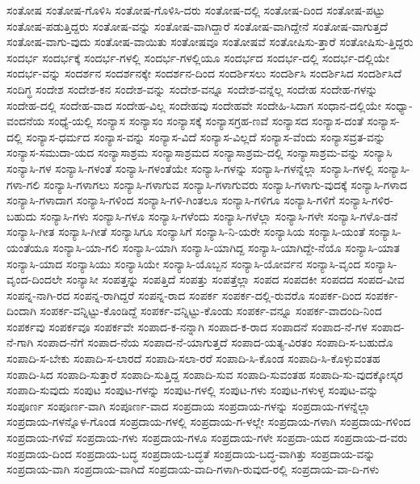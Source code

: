 {ಸಂತೋಷ
ಸಂತೋಷ-ಗೊಳಿಸಿ
ಸಂತೋಷ-ಗೊಳಿಸಿ-ದರು
ಸಂತೋಷ-ದಲ್ಲಿ
ಸಂತೋಷ-ದಿಂದ
ಸಂತೋಷ-ಪಟ್ಟು
ಸಂತೋಷ-ಪಡುತ್ತಿದ್ದರು
ಸಂತೋಷ-ವನ್ನು
ಸಂತೋಷ-ವಾಗಿದ್ದಾರೆ
ಸಂತೋಷ-ವಾಗಿದ್ದೇನೆ
ಸಂತೋಷ-ವಾಗುತ್ತದೆ
ಸಂತೋಷ-ವಾಗು-ವುದು
ಸಂತೋಷ-ವಾಯಿತು
ಸಂತೋಷವೂ
ಸಂತೋಷವೆ
ಸಂತೋಷಿಸು-ತ್ತಾರೆ
ಸಂತೋಷಿಸು-ತ್ತಿದ್ದರು
ಸಂದರ್ಭ
ಸಂದರ್ಭಕ್ಕೆ
ಸಂದರ್ಭ-ಗಳಲ್ಲಿ
ಸಂದರ್ಭ-ಗಳಲ್ಲಿಯೂ
ಸಂದರ್ಭದ
ಸಂದರ್ಭ-ದಲ್ಲಿ
ಸಂದರ್ಭ-ದಲ್ಲಿಯೇ
ಸಂದರ್ಭ-ವನ್ನು
ಸಂದರ್ಶನ
ಸಂದರ್ಶನಕ್ಕೇ
ಸಂದರ್ಶನ-ದಿಂದ
ಸಂದರ್ಶಿಸಲು
ಸಂದರ್ಶಿಸಿ
ಸಂದರ್ಶಿಸಿದ
ಸಂದರ್ಶಿಸಿದೆ
ಸಂದಿಗ್ಧ
ಸಂದೇಶ
ಸಂದೇಶ-ಕನ
ಸಂದೇಶ-ವನ್ನು
ಸಂದೇಶ-ವನ್ನೂ
ಸಂದೇಶ-ವನ್ನೆಲ್ಲ
ಸಂದೇಹ
ಸಂದೇಹ-ಗಳನ್ನು
ಸಂದೇಹ-ದಲ್ಲಿ
ಸಂದೇಹ-ವಾದ
ಸಂದೇಹ-ವಿಲ್ಲ
ಸಂದೇಹವು
ಸಂದೇಹವೇ
ಸಂದೇಹಿ-ಸಿದಾಗ
ಸಂಧಾನ-ದಲ್ಲಿಯೇ
ಸಂಧ್ಯಾ-ವಂದನೆಯ
ಸಂಧ್ಯೆ-ಯಲ್ಲಿ
ಸಂನ್ಯಾಸ
ಸಂನ್ಯಾಸಂ
ಸಂನ್ಯಾಸಕ್ಕೆ
ಸಂನ್ಯಾಸಗ್ರಹ-ಣವೆ
ಸಂನ್ಯಾಸದ
ಸಂನ್ಯಾಸ-ದಂತೆ
ಸಂನ್ಯಾಸ-ದಲ್ಲಿ
ಸಂನ್ಯಾಸ-ಧರ್ಮದ
ಸಂನ್ಯಾಸ-ವನ್ನು
ಸಂನ್ಯಾಸ-ವಿದೆ
ಸಂನ್ಯಾಸ-ವಿಲ್ಲದೆ
ಸಂನ್ಯಾಸ-ವೆಂದು
ಸಂನ್ಯಾಸವ್ರತ-ವನ್ನು
ಸಂನ್ಯಾಸ-ಸಮುದಾ-ಯದ
ಸಂನ್ಯಾಸಾಶ್ರಮ
ಸಂನ್ಯಾಸಾಶ್ರಮದ
ಸಂನ್ಯಾಸಾಶ್ರಮ-ದಲ್ಲಿ
ಸಂನ್ಯಾಸಾಶ್ರಮ-ವನ್ನು
ಸಂನ್ಯಾಸಿ
ಸಂನ್ಯಾಸಿ-ಗಳ
ಸಂನ್ಯಾಸಿ-ಗಳಂತೆ
ಸಂನ್ಯಾಸಿ-ಗಳಂತೆಯೇ
ಸಂನ್ಯಾಸಿ-ಗಳನ್ನು
ಸಂನ್ಯಾಸಿ-ಗಳನ್ನೆಲ್ಲಾ
ಸಂನ್ಯಾಸಿ-ಗಳಲ್ಲಿ
ಸಂನ್ಯಾಸಿ-ಗಳಾ-ಗಲಿ
ಸಂನ್ಯಾಸಿ-ಗಳಾಗಲು
ಸಂನ್ಯಾಸಿ-ಗಳಾಗುವ
ಸಂನ್ಯಾಸಿ-ಗಳಾಗುವರು
ಸಂನ್ಯಾಸಿ-ಗಳಾಗು-ವುದಕ್ಕೆ
ಸಂನ್ಯಾಸಿ-ಗಳಾದ
ಸಂನ್ಯಾಸಿ-ಗಳಾದಾಗ
ಸಂನ್ಯಾಸಿ-ಗಳಿಂದ
ಸಂನ್ಯಾಸಿ-ಗಳಿ-ಗಿಂತಲೂ
ಸಂನ್ಯಾಸಿ-ಗಳಿಗೂ
ಸಂನ್ಯಾಸಿ-ಗಳಿಗೆ
ಸಂನ್ಯಾಸಿ-ಗಳಿರ-ಬಹುದು
ಸಂನ್ಯಾಸಿ-ಗಳು
ಸಂನ್ಯಾಸಿ-ಗಳೂ
ಸಂನ್ಯಾಸಿ-ಗಳೆಂದು
ಸಂನ್ಯಾಸಿ-ಗಳೆಲ್ಲಾ
ಸಂನ್ಯಾಸಿ-ಗಳೇ
ಸಂನ್ಯಾಸಿ-ಗಳೊ-ಡನೆ
ಸಂನ್ಯಾಸಿ-ಗೀತ
ಸಂನ್ಯಾಸಿ-ಗೀತೆ
ಸಂನ್ಯಾಸಿಗೂ
ಸಂನ್ಯಾಸಿಗೆ
ಸಂನ್ಯಾಸಿ-ನಿ-ಯರೇ
ಸಂನ್ಯಾಸಿಯ
ಸಂನ್ಯಾಸಿ-ಯಂತೆ
ಸಂನ್ಯಾಸಿ-ಯಂತೆಯೂ
ಸಂನ್ಯಾಸಿ-ಯಾ-ಗಲಿ
ಸಂನ್ಯಾಸಿ-ಯಾಗಿ
ಸಂನ್ಯಾಸಿ-ಯಾಗಿದ್ದ
ಸಂನ್ಯಾಸಿ-ಯಾಗಿದ್ದೇ-ನೆಯೊ
ಸಂನ್ಯಾಸಿ-ಯಾತ
ಸಂನ್ಯಾಸಿ-ಯಾದ
ಸಂನ್ಯಾಸಿಯು
ಸಂನ್ಯಾಸಿಯೇ
ಸಂನ್ಯಾಸಿ-ಯೊಬ್ಬನ
ಸಂನ್ಯಾಸಿ-ಯೋರ್ವನ
ಸಂನ್ಯಾಸಿ-ವೃಂದ
ಸಂನ್ಯಾಸಿ-ವೃಂದ-ದಿಂದಲೇ
ಸಂನ್ಯಾಸೀ
ಸಂಪತ್ತನ್ನು
ಸಂಪತ್ತಿದೆ
ಸಂಪತ್ತು
ಸಂಪತ್ತೆಲ್ಲಾ
ಸಂಪದ
ಸಂಪದಕೀ
ಸಂಪದದ
ಸಂಪದ-ವೀವ
ಸಂಪನ್ನ-ನಾಗಿ-ರದ
ಸಂಪನ್ನ-ರಾಗಿದ್ದರೆ
ಸಂಪನ್ನ-ರಾದ
ಸಂಪರ್ಕ
ಸಂಪರ್ಕ-ದಲ್ಲಿ-ರುವರೊ
ಸಂಪರ್ಕ-ದಿಂದ
ಸಂಪರ್ಕ-ದಿಂದಾಗಿ
ಸಂಪರ್ಕ-ವನ್ನಿಟ್ಟು-ಕೊಂಡಿದ್ದೆ
ಸಂಪರ್ಕ-ವನ್ನಿಟ್ಟು-ಕೊಂಡು
ಸಂಪರ್ಕ-ವನ್ನೂ
ಸಂಪರ್ಕ-ವಾದಂದಿ-ನಿಂದ
ಸಂಪರ್ಕವು
ಸಂಪರ್ಕವೂ
ಸಂಪರ್ಕವೇ
ಸಂಪಾದ-ಕ-ನನ್ನಾಗಿ
ಸಂಪಾದ-ಕ-ರಾದ
ಸಂಪಾದನೆ
ಸಂಪಾದ-ನೆ-ಗಳ
ಸಂಪಾದ-ನೆ-ಗಾಗಿ
ಸಂಪಾದ-ನೆಗೆ
ಸಂಪಾದ-ನೆಯ
ಸಂಪಾದ-ನೆ-ಯಾಗುತ್ತದೆ
ಸಂಪಾದ-ಯತ್ಯ-ವಿರತಂ
ಸಂಪಾದಿ-ಸ-ಬಹುದೊ
ಸಂಪಾದಿ-ಸ-ಬೇಕು
ಸಂಪಾದಿ-ಸ-ಲಾರದೆ
ಸಂಪಾದಿ-ಸಲಾ-ರರೆ
ಸಂಪಾದಿ-ಸಿ-ಕೊಂಡ
ಸಂಪಾದಿ-ಸಿ-ಕೊಳ್ಳುವಂತಹ
ಸಂಪಾದಿ-ಸಿದ
ಸಂಪಾದಿ-ಸುತ್ತಾರೆ
ಸಂಪಾದಿ-ಸುತ್ತಿದ್ದ
ಸಂಪಾದಿ-ಸುವ
ಸಂಪಾದಿ-ಸುವಂತಹ
ಸಂಪಾದಿ-ಸು-ವುದಕ್ಕೋಸ್ಕರ
ಸಂಪಾದಿ-ಸುವುದು
ಸಂಪುಟ
ಸಂಪುಟ-ಗಳನ್ನು
ಸಂಪುಟ-ಗಳಲ್ಲಿ
ಸಂಪುಟ-ಗಳು
ಸಂಪುಟ-ಗಳುಳ್ಳ
ಸಂಪುಟ-ವನ್ನು
ಸಂಪೂರ್ಣ
ಸಂಪೂರ್ಣ-ವಾಗಿ
ಸಂಪೂರ್ಣ-ವಾದ
ಸಂಪ್ರದಾಯ
ಸಂಪ್ರದಾಯ-ಗಳನ್ನು
ಸಂಪ್ರದಾಯ-ಗಳನ್ನೆಲ್ಲಾ
ಸಂಪ್ರದಾಯ-ಗಳನ್ನೊಳ-ಗೊಂಡ
ಸಂಪ್ರದಾಯ-ಗಳಲ್ಲಿ
ಸಂಪ್ರದಾಯ-ಗ-ಳಲ್ಲೇ
ಸಂಪ್ರದಾಯ-ಗಳಾಗಿ
ಸಂಪ್ರದಾಯ-ಗಳಿಂದ
ಸಂಪ್ರದಾಯ-ಗಳಿವೆ
ಸಂಪ್ರದಾಯ-ಗಳು
ಸಂಪ್ರದಾಯ-ಗಳೂ
ಸಂಪ್ರದಾಯ-ಗಳೇ
ಸಂಪ್ರದಾ-ಯದ
ಸಂಪ್ರದಾಯ-ದ-ವರು
ಸಂಪ್ರದಾಯ-ದಿಂದ
ಸಂಪ್ರದಾಯ-ಬದ್ಧ
ಸಂಪ್ರದಾಯ-ಬದ್ಧತೆ
ಸಂಪ್ರದಾಯ-ಬದ್ಧ-ವಾಗಿತ್ತು
ಸಂಪ್ರದಾಯ-ವನ್ನು
ಸಂಪ್ರದಾಯ-ವಾಗಿ
ಸಂಪ್ರದಾಯ-ವಾಗಿದೆ
ಸಂಪ್ರದಾಯ-ವಾದಿ-ಗಳಾಗಿ-ರುವುದ-ರಲ್ಲಿ
ಸಂಪ್ರದಾಯ-ವಾ-ದಿ-ಗಳು
}
